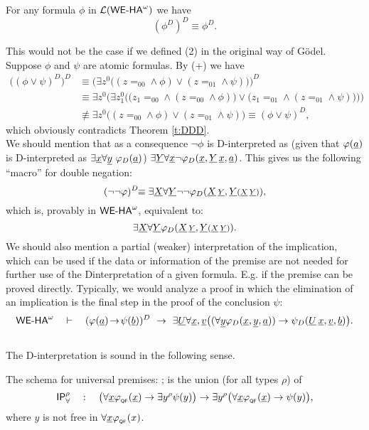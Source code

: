 \begin{thm}\label{t:DDD}
For any formula $\phi$ in ${\mathcal L}({\textsf{\upshape WE-HA}}^{\omega})$ we have
\[
(\phi^D)^D\equiv\phi^D\text{.}
\]
\end{thm}
This would not be the case if we defined (2) in the original way of G\"odel.
Suppose $\phi$ and $\psi$ are atomic formulas. By (+) we have
\begin{align*}
\big((\phi \vee \psi)^D\big)^D
&\equiv\Big(\exists z^0 \big(  ( z\!=_00\wedge\phi ) \vee  ( z\!=_01\wedge\psi )  \big)  \Big)^D\\
&\equiv\exists z^0\bigg(\exists z_1^0 \Big(  
  \big( z_1\!=_00\wedge(z\!=_00\wedge\phi )\big) \vee  
  \big( z_1\!=_01\wedge(z\!=_01\wedge\psi )\big) \Big) \bigg)  \\
&\not\equiv \exists z^0 \big(  ( z\!=_00\wedge\phi ) \vee  ( z\!=_01\wedge\psi )  \big)  
\equiv(\phi \vee \psi)^D
\text{,}
\end{align*}
which obviously contradicts Theorem \ref{t:DDD}.\\
We should mention that as a consequence $\neg\phi$
is D-interpreted as (given that $\varphi(\underline a)$ is D-interpreted as
$\exists \underline x\forall \underline y\ \varphi_D(\underline{a})$) 
$\exists\underline Y\forall\underline x \neg\varphi_D(\underline x,\underline Y\,\underline x,\underline a)$. This gives
us the following ``macro'' for double negation:
\[
(\neg\neg\phi)^D\!\!\equiv
        \exists\tup X\forall\tup Y\neg\neg\phi_D(\tup X\atup {\args Y},\tup Y\args{(\tup X\atup Y)})\text{,}\]
which is, provably in ${\textsf{\upshape WE-HA}}^{\omega}$, equivalent to:
\[   \exists\tup X\forall\tup Y\phi_D(\tup X\args{\atup Y},\tup Y\args{(\tup X\atup Y)}) \text{.}\]
We should also mention a partial (weaker) interpretation of the implication,
which can be used if the data or information of the premise are not needed
for further use of the D\nbd interpretation of a given formula. E.g. if the
premise can be proved directly. Typically, we would analyze a proof in which
the elimination of an implication is the final step in the 
proof of the conclusion $\psi$:
\[
\weha\quad\proves\quad(\phi(\tup a)\!\rightarrow\!\psi(\tup b))^D\ \rightarrow\ 
  \exists \tup U\forall \tup x, \tup v
  \big((\forall\tup y\phi_D(\tup x,\tup y,\tup{a})) \rightarrow 
   \psi_D(\tup U\atup x,\tup v, \tup{b})\big)
\text{.}\]\\

The D-interpretation is sound in the following sense.
\begin{dfn}
The  schema for universal premises:
\defkeyn{$\IP^\omega_\forall$}; is the union (for all types $\rho$) of
\[
\textsf{\upshape IP}^\rho_\forall\quad:\quad
   \big(\forall\underline x\varphi_{{}_{\textsf{\upshape QF}}}(\underline x)\rightarrow \exists y^\rho\psi(y)\big)
   \rightarrow \exists y^\rho\big(\forall\underline x\varphi_{{}_{\textsf{\upshape QF}}}(\underline x)\rightarrow\psi(y)\big)
\text{,}
\]
where $y$ is not free in $\forall \underline x\varphi_{{}_{\textsf{\upshape QF}}}(x)$.
\end{dfn}

